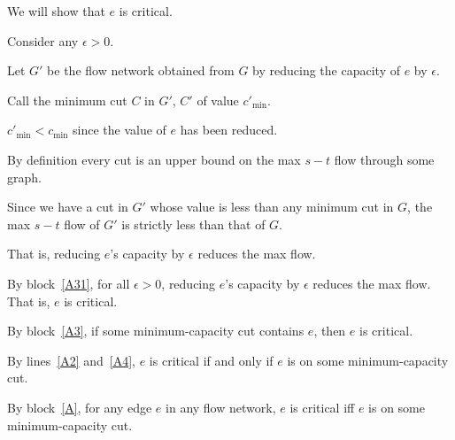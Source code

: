 \documentclass[10pt]{article}
\begin{document}
\begin{longFormProof}
\begin{block}[A]
\begin{block}[A3]
      \step We will show that $e$ is critical.  

      \smallskip
      
      \begin{block}[A31]
        {Consider any $\epsilon>0$.}

        \step Let $G'$ be the flow network obtained from $G$ by reducing the capacity of $e$ by $\epsilon$.

        \step Call the minimum cut $C$ in $G'$, $C'$ of value $c'_{\min}$.

        \step $c'_{\min} < c_{\min}$ since the value of $e$ has been reduced.

        \step By definition every cut is an upper bound on the max $s-t$ flow through some graph.

        \step Since we have a cut in $G'$ whose value is less than any minimum cut in $G$, the max $s-t$ flow of $G'$ is strictly less than that of $G$.

        \step That is, reducing $e$'s capacity by $\epsilon$ reduces the max flow.
      \end{block}

      \medskip 

      \step By block~\ref{A31}, for all $\epsilon>0$,
      reducing $e$'s capacity by $\epsilon$ reduces the max flow.
      That is, $e$ is critical.
    \end{block}
    
    \step[A4] By block~\ref{A3}, if some minimum-capacity cut contains $e$, then $e$ is critical.
    
    \smallskip 

    \lineacross 

    \step By lines~\ref{A2} and~\ref{A4}, $e$ is critical if and only if $e$ is on some minimum-capacity cut. 
  \end{block}

  \step By block~\ref{A}, for any edge $e$ in any flow network, $e$ is critical iff $e$ is on some minimum-capacity cut. 
\end{longFormProof}
\end{document}
